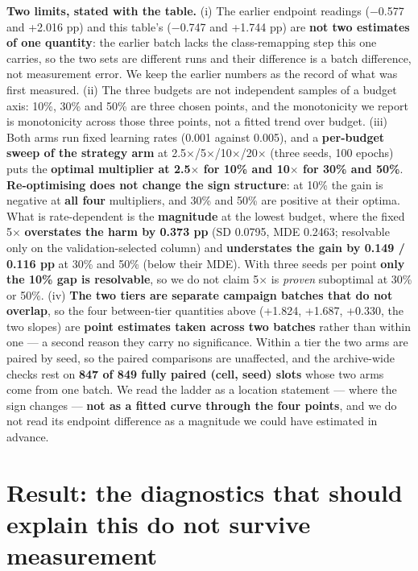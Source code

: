 \documentclass[pdflatex,sn-mathphys-ay]{sn-jnl}
\begin{document}
\textbf{Two limits, stated with the table.} (i) The earlier endpoint readings (\ensuremath{-}0.577 and +2.016 pp) and this table's (\ensuremath{-}0.747 and +1.744 pp) are \textbf{not two estimates of one quantity}: the earlier batch lacks the class-remapping step this one carries, so the two sets are different runs and their difference is a batch difference, not measurement error. We keep the earlier numbers as the record of what was first measured. (ii) The three budgets are not independent samples of a budget axis: 10\%, 30\% and 50\% are three chosen points, and the monotonicity we report is monotonicity across those three points, not a fitted trend over budget. (iii) Both arms run fixed learning rates (0.001 against 0.005), and a \textbf{per-budget sweep of the strategy arm} at 2.5\ensuremath{\times}/5\ensuremath{\times}/10\ensuremath{\times}/20\ensuremath{\times} (three seeds, 100 epochs) puts the \textbf{optimal multiplier at 2.5\ensuremath{\times} for 10\% and 10\ensuremath{\times} for 30\% and 50\%}. \textbf{Re-optimising does not change the sign structure}: at 10\% the gain is negative at \textbf{all four} multipliers, and 30\% and 50\% are positive at their optima. What is rate-dependent is the \textbf{magnitude} at the lowest budget, where the fixed 5\ensuremath{\times} \textbf{overstates the harm by 0.373 pp} (SD 0.0795, MDE 0.2463; resolvable only on the validation-selected column) and \textbf{understates the gain by 0.149 / 0.116 pp} at 30\% and 50\% (below their MDE). With three seeds per point \textbf{only the 10\% gap is resolvable}, so we do not claim 5\ensuremath{\times} is \emph{proven} suboptimal at 30\% or 50\%. (iv) \textbf{The two tiers are separate campaign batches that do not overlap}, so the four between-tier quantities above (+1.824, +1.687, +0.330, the two slopes) are \textbf{point estimates taken across two batches} rather than within one --- a second reason they carry no significance. Within a tier the two arms are paired by seed, so the paired comparisons are unaffected, and the archive-wide checks rest on \textbf{847 of 849 fully paired (cell, seed) slots} whose two arms come from one batch. We read the ladder as a location statement --- where the sign changes --- \textbf{not as a fitted curve through the four points}, and we do not read its endpoint difference as a magnitude we could have estimated in advance.

\section{Result: the diagnostics that should explain this do not survive measurement}%
\end{document}
